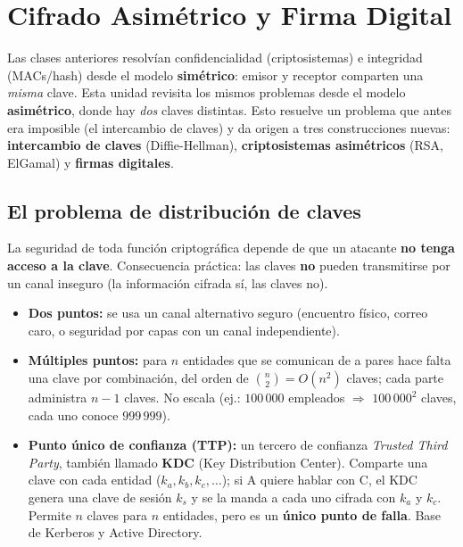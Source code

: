 \documentclass[../main.tex]{subfiles}
\begin{document}
\section{Cifrado Asimétrico y Firma Digital}

Las clases anteriores resolvían confidencialidad (criptosistemas) e integridad
(MACs/hash) desde el modelo \textbf{simétrico}: emisor y receptor comparten una
\emph{misma} clave. Esta unidad revisita los mismos problemas desde el modelo
\textbf{asimétrico}, donde hay \emph{dos} claves distintas. Esto resuelve un
problema que antes era imposible (el intercambio de claves) y da origen a tres
construcciones nuevas: \textbf{intercambio de claves} (Diffie-Hellman),
\textbf{criptosistemas asimétricos} (RSA, ElGamal) y \textbf{firmas digitales}.


\subsection{El problema de distribución de claves}

La seguridad de toda función criptográfica depende de que un atacante \textbf{no
tenga acceso a la clave}. Consecuencia práctica: las claves \textbf{no} pueden
transmitirse por un canal inseguro (la información cifrada sí, las claves no).
\begin{itemize}[leftmargin=1.4em]
  \item \textbf{Dos puntos:} se usa un canal alternativo seguro (encuentro
  físico, correo caro, o seguridad por capas con un canal independiente).
  \item \textbf{Múltiples puntos:} para $n$ entidades que se comunican de a pares
  hace falta una clave por combinación, del orden de $\binom{n}{2}=O(n^2)$ claves;
  cada parte administra $n-1$ claves. No escala (ej.: $100\,000$ empleados $\Rightarrow$
  $100\,000^2$ claves, cada uno conoce $999\,999$).
  \item \textbf{Punto único de confianza (TTP):} un tercero de confianza
  \emph{Trusted Third Party}, también llamado \textbf{KDC} (Key Distribution
  Center). Comparte una clave con cada entidad ($k_a,k_b,k_c,\dots$); si A quiere
  hablar con C, el KDC genera una clave de sesión $k_s$ y se la manda a cada uno
  cifrada con $k_a$ y $k_c$. Permite $n$ claves para $n$ entidades, pero es un
  \textbf{único punto de falla}. Base de Kerberos y Active Directory.
\end{itemize}
\end{document}
